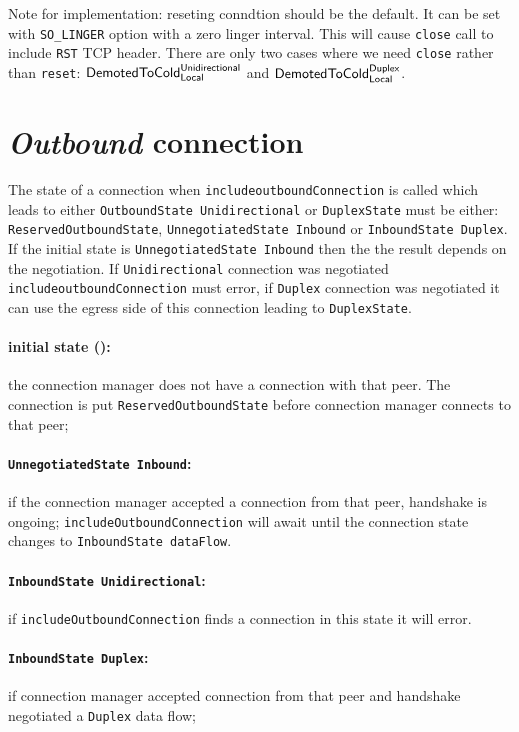 \documentclass{article}
\def\TCP{\textsf{TCP}}
\def\InitialState{\textbullet}
\def\ReservedOutboundState{\texttt{ReservedOutboundState}}
\def\UnnegotiatedStateIn{\texttt{UnnegotiatedState Inbound}}
\def\OutboundStateUni{\texttt{OutboundState Unidirectional}}
\def\DuplexState{\texttt{DuplexState}}
\def\InboundStateUni{\texttt{InboundState Unidirectional}}
\def\InboundStateDup{\texttt{InboundState Duplex}}
\def\InboundStateAny{\texttt{InboundState dataFlow}}
\def\DemotedToColdDupLoc{$\text{\textsf{DemotedToCold}}^\text{\textsf{Duplex}}_\text{\textsf{Local}}$}
\def\DemotedToColdUniLoc{$\text{\textsf{DemotedToCold}}^\text{\textsf{Unidirectional}}_\text{\textsf{Local}}$}
\begin{document}
{\small
Note for implementation: reseting conndtion should be the default.  It can be
set with \texttt{SO\_LINGER} option with a zero linger interval.  This will
cause \texttt{close} call to include \texttt{RST} \TCP{} header.  There are
only two cases where we need \texttt{close} rather than \texttt{reset}:
\DemotedToColdUniLoc{} and \DemotedToColdDupLoc{}.
}

\section{\textit{Outbound} connection}

The state of a connection when \texttt{includeoutboundConnection} is called
which leads to either \OutboundStateUni{} or \DuplexState{} must be either:
\ReservedOutboundState{}, \UnnegotiatedStateIn{} or
\InboundStateDup{}.  If the initial state is \UnnegotiatedStateIn{} then the
the result depends on the negotiation.  If \texttt{Unidirectional} connection was
negotiated \texttt{includeoutboundConnection} must error, if \texttt{Duplex}
connection was negotiated it can use the egress side of this connection leading
to \DuplexState{}.

\paragraph{\textnormal{initial state (\InitialState{})}:} the connection manager does not have
  a connection with that peer.  The  connection is put \ReservedOutboundState{}
  before connection manager connects to that peer;

\paragraph{\UnnegotiatedStateIn{}:} if the connection manager accepted
  a connection from that peer, handshake is ongoing;
  \texttt{includeOutboundConnection} will await until the connection state
  changes to \InboundStateAny{}.

\paragraph{\InboundStateUni{}:} if \texttt{includeOutboundConnection} finds
a connection in this state it will error.

\paragraph{\InboundStateDup{}:} if connection manager accepted connection from
  that peer and handshake negotiated a \texttt{Duplex} data flow;
\end{document}
